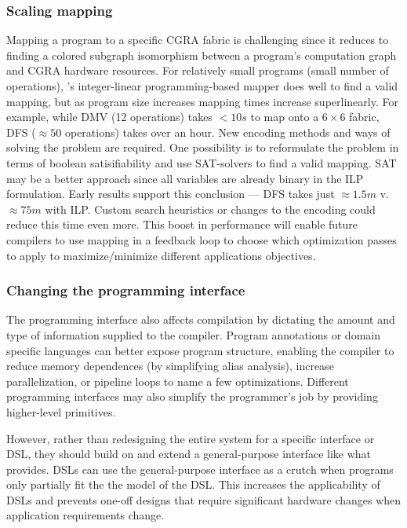 \subsubsection{Scaling mapping}
Mapping a program to a specific CGRA fabric is challenging since it reduces to finding a colored subgraph isomorphism between a program's computation graph and CGRA hardware resources.
% 
For relatively small programs (small number of operations), \riptide's integer-linear programming-based mapper does well to find a valid mapping, but as program size increases mapping times increase superlinearly.
% 
For example, while DMV (12 operations) takes $<10s$ to map onto a $6\times6$ fabric, DFS ($\approx 50$ operations) takes over an hour.
% 
New encoding methods and ways of solving the problem are required.
% 
One possibility is to reformulate the problem in terms of boolean satisifiability and use SAT-solvers to find a valid mapping.
% 
SAT may be a better approach since all variables are already binary in the ILP formulation.
% 
Early results support this conclusion --- DFS takes just $\approx1.5m$ v. $\approx75m$ with ILP.
% 
Custom search heuristics or changes to the encoding could reduce this time even more.
% 
This boost in performance will enable future compilers to use mapping in a feedback loop to choose which optimization passes to apply to maximize/minimize different applications objectives.

\subsubsection{Changing the programming interface}
The programming interface also affects compilation by dictating the amount and type of information supplied to the compiler.
% 
Program annotations or domain specific languages can better expose program structure, enabling the compiler to reduce memory dependences (by simplifying alias analysis), increase parallelization, or pipeline loops to name a few optimizations. 
% 
Different programming interfaces may also simplify the programmer's job by providing higher-level primitives.

However, rather than redesigning the entire system for a specific interface or DSL, they should build on and extend a general-purpose interface like what \riptide provides.
% 
DSLs can use the general-purpose interface as a crutch when programs only partially fit the the model of the DSL.
% 
This increases the applicability of DSLs and prevents one-off designs that require significant hardware changes when application requirements change.

